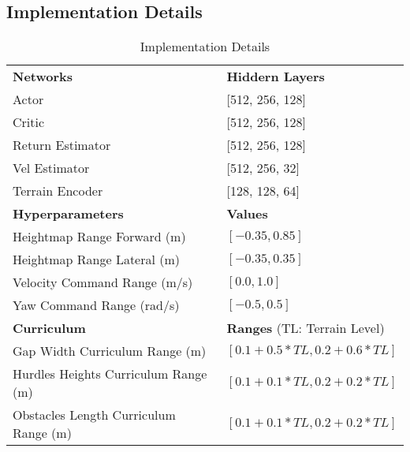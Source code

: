 \begin{appendices}
\section{Implementation Details}
\begin{table}[!htbp]
    \centering
    \caption{Implementation Details}
    \begin{tabular}{ll}
    \toprule[1.5pt]
    \textbf{Networks} & \textbf{Hiddern Layers}\\
    Actor & [512, 256, 128] \\
    Critic & [512, 256, 128] \\
    Return Estimator & [512, 256, 128] \\
    Vel Estimator & [512, 256, 32] \\
    Terrain Encoder & [128, 128, 64] \\
    \midrule
    \textbf{Hyperparameters} & \textbf{Values}\\
    Heightmap Range Forward (m) & $[-0.35, 0.85]$ \\
    Heightmap Range Lateral (m) & $[-0.35, 0.35]$ \\
    Velocity Command Range (m/s) & $[0.0, 1.0]$ \\
    Yaw Command Range (rad/s) & $[-0.5, 0.5]$ \\
    \midrule
    \textbf{Curriculum} & \textbf{Ranges} (TL: Terrain Level)\\
    Gap Width Curriculum Range (m) & $[0.1+0.5*TL, 0.2 + 0.6*TL]$ \\
    Hurdles Heights Curriculum Range (m) & $[0.1+0.1*TL, 0.2 + 0.2*TL]$ \\
    Obstacles Length Curriculum Range (m) & $[0.1+0.1*TL, 0.2 + 0.2*TL]$ \\
    \bottomrule[1.5pt]
    \end{tabular}
    \label{tab:ImplementationDetails}
\end{table}



\end{appendices}
